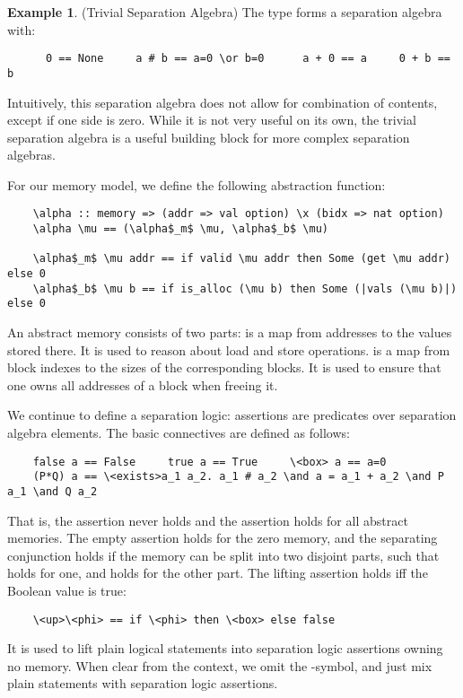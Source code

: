 \documentclass[sn-mathphys,Numbered]{sn-jnl}
\theoremstyle{thmstyleone}%
\theoremstyle{definition}%
\newtheorem{example}{Example}%
\theoremstyle{thmstylethree}%
\begin{document}
  \begin{example}(Trivial Separation Algebra)
    The type  forms a separation algebra with:
    \begin{lstlisting}
      0 == None     a # b == a=0 \or b=0      a + 0 == a     0 + b == b
    \end{lstlisting}
    Intuitively, this separation algebra does not allow for combination of contents, except if one side is zero.
    While it is not very useful on its own, the trivial separation algebra is a useful building block for
    more complex separation algebras.
  \end{example}

  For our memory model, we define the following abstraction function:
  \begin{lstlisting}
    \alpha :: memory => (addr => val option) \x (bidx => nat option)
    \alpha \mu == (\alpha$_m$ \mu, \alpha$_b$ \mu)

    \alpha$_m$ \mu addr == if valid \mu addr then Some (get \mu addr) else 0
    \alpha$_b$ \mu b == if is_alloc (\mu b) then Some (|vals (\mu b)|) else 0
  \end{lstlisting}
  An abstract memory \is{\alpha \mu} consists of two parts:
   is a map from addresses to the values stored there. It is used to reason about load and store operations.
   is a map from block indexes to the sizes of the corresponding blocks.
    It is used to ensure that one owns all addresses of a block when freeing it.

  We continue to define a separation logic: assertions are predicates over separation algebra elements.
  The basic connectives are defined as follows:
  \begin{lstlisting}
    false a == False     true a == True     \<box> a == a=0
    (P*Q) a == \<exists>a_1 a_2. a_1 # a_2 \and a = a_1 + a_2 \and P a_1 \and Q a_2
  \end{lstlisting}
  That is, the assertion  never holds and the assertion  holds for all abstract memories.
  The empty assertion  holds for the zero memory, and the separating conjunction 
  holds if the memory can be split into two disjoint parts, such that  holds for one,
  and  holds for the other part. The lifting assertion  holds iff the Boolean value  is true:
  \begin{lstlisting}
    \<up>\<phi> == if \<phi> then \<box> else false
  \end{lstlisting}
  It is used to lift plain logical statements into separation logic assertions owning no memory.
  When clear from the context, we omit the -symbol, and just mix plain statements with separation logic assertions.
\end{document}
